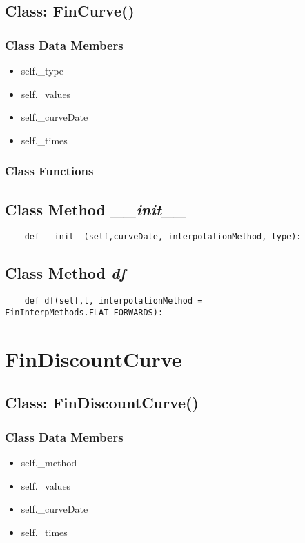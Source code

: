 \documentclass[twoside,11pt]{book}
\begin{document}
\subsection{Class: FinCurve()}


\subsubsection{Class Data Members}
\begin{itemize}
\item{self.\_type}
\item{self.\_values}
\item{self.\_curveDate}
\item{self.\_times}
\end{itemize}

\subsubsection{Class Functions}

\subsection{Class Method {\it \_\_init\_\_}}


\begin{lstlisting}
    def __init__(self,curveDate, interpolationMethod, type):
\end{lstlisting}

\subsection{Class Method {\it df}}


\begin{lstlisting}
    def df(self,t, interpolationMethod = FinInterpMethods.FLAT_FORWARDS):
\end{lstlisting}

\newpage
\section{FinDiscountCurve}

\subsection{Class: FinDiscountCurve()}


\subsubsection{Class Data Members}
\begin{itemize}
\item{self.\_method}
\item{self.\_values}
\item{self.\_curveDate}
\item{self.\_times}
\end{itemize}
\end{document}
